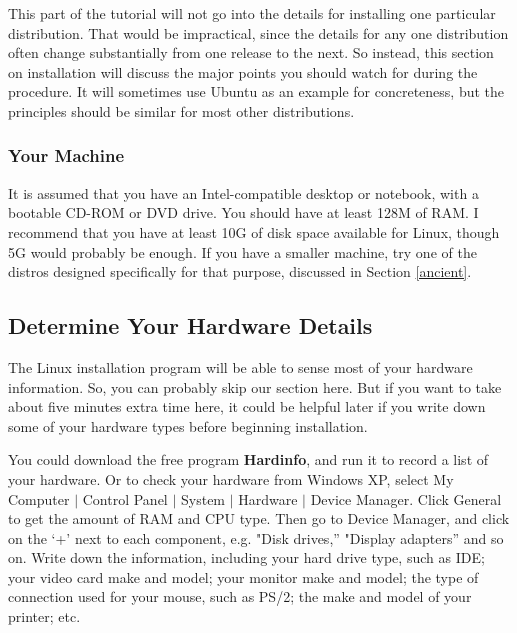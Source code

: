 \documentclass[11pt]{article}
\begin{document}
This part of the tutorial will not go into the details for installing
one particular distribution.  That would be impractical, since the
details for any one distribution often change substantially from one
release to the next.  So instead, this section on installation will
discuss the major points you should watch for during the procedure.  It
will sometimes use Ubuntu as an example for concreteness, but the
principles should be similar for most other distributions.

\subsubsection{Your Machine}

It is assumed that you have an Intel-compatible desktop or notebook,
with a bootable CD-ROM or DVD drive.
You should have at least 128M of RAM.  I recommend that you have at
least 10G of disk space available for Linux, though 5G would probably be
enough.  If you have a smaller machine, try one of the distros designed
specifically for that purpose, discussed in Section \ref{ancient}.

\subsection{Determine Your Hardware Details}

The Linux installation program will be able to sense most of your
hardware information.  So, you can probably skip our section here.  But
if you want to take about five minutes extra time here, it could be
helpful later if you write down some of your hardware types before
beginning installation.

You could download the free program {\bf Hardinfo}, and run it to record
a list of your hardware.  Or to check your hardware from Windows XP,
select My Computer $|$ Control Panel $|$ System $|$ Hardware $|$ Device
Manager.  Click General to get the amount of RAM and CPU type. Then go
to Device Manager, and click on the `+' next to each component, e.g.
"Disk drives,'' "Display adapters'' and so on.  Write down the
information, including your hard drive type, such as IDE; your video
card make and model; your monitor make and model; the type of connection
used for your mouse, such as PS/2; the make and model of your printer;
etc. 
\end{document}
